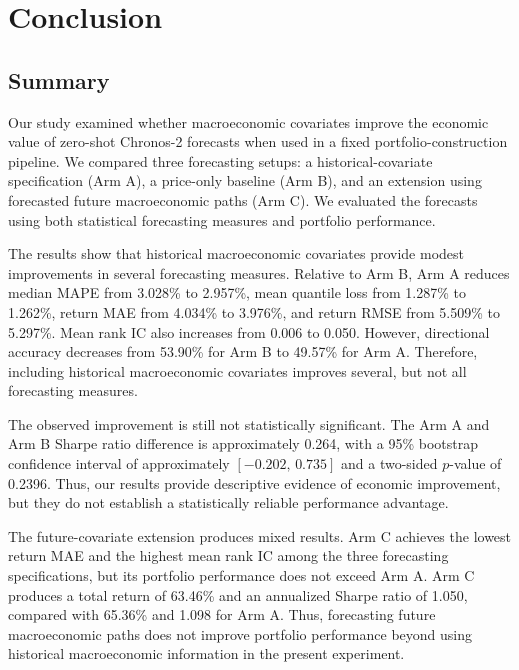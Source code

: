 \documentclass[12pt,a4paper,twoside,openany]{book}
\begin{document}
\chapter{Conclusion}\label{conclusion}

\section{Summary}\label{summary}

Our study examined whether macroeconomic covariates improve the economic value of zero-shot Chronos-2 forecasts when used in a fixed portfolio-construction pipeline. We compared three forecasting setups:  a historical-covariate specification (Arm A), a price-only baseline (Arm B), and an extension using forecasted future macroeconomic paths (Arm C). We evaluated the forecasts using both statistical forecasting measures and portfolio performance. 

The results show that historical macroeconomic covariates provide modest improvements in several forecasting measures. Relative to Arm B, Arm A reduces median MAPE from 3.028\% to 2.957\%, mean quantile loss from 1.287\% to 1.262\%, return MAE from 4.034\% to 3.976\%, and return RMSE from 5.509\% to 5.297\%. Mean rank IC also increases from 0.006 to 0.050. However, directional accuracy decreases from 53.90\% for Arm B to 49.57\% for Arm A. Therefore, including historical macroeconomic covariates improves several, but not all forecasting measures.

The observed improvement is still not statistically significant. The Arm A and Arm B Sharpe ratio difference is approximately 0.264, with a 95\% bootstrap confidence interval of approximately \([-0.202,\,0.735]\) and a two-sided \(p\)-value of 0.2396. Thus, our results provide descriptive evidence of economic improvement, but they do not establish a statistically reliable performance advantage. 

The future-covariate extension produces mixed results. Arm C achieves the lowest return MAE and the highest mean rank IC among the three forecasting specifications, but its portfolio performance does not exceed Arm A. Arm C produces a total return of 63.46\% and an annualized Sharpe ratio of 1.050, compared with 65.36\% and 1.098 for Arm A. Thus, forecasting future macroeconomic paths does not improve portfolio performance beyond using historical macroeconomic information in the present experiment.
\end{document}
